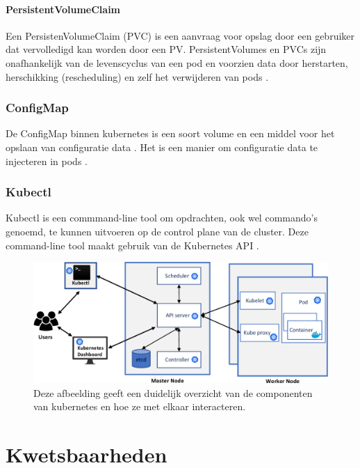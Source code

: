 \paragraph{PersistentVolumeClaim}
Een PersistenVolumeClaim (PVC) is een aanvraag voor opslag door een gebruiker dat vervolledigd kan worden door een PV. PersistentVolumes en PVCs zijn onafhankelijk van de levenscyclus van een pod en voorzien data door herstarten, herschikking (rescheduling) en zelf het verwijderen van pods \autocite{KubernetesDocs-2023}. 

\subsubsection{ConfigMap}
De ConfigMap binnen kubernetes is een soort volume en een middel voor het opslaan van configuratie data \autocite{KubernetesDocs-2023}.
Het is een manier om configuratie data te injecteren in pods \autocite{KubernetesDocs-2023}.

\subsubsection{Kubectl}
Kubectl is een commmand-line tool om opdrachten, ook wel commando's genoemd, te kunnen uitvoeren op de control plane van de cluster.
Deze command-line tool maakt gebruik van de Kubernetes API \autocite{KubernetesDocs-2023}.

\begin{flushleft}
    \begin{figure}[h]
        \includegraphics[width=.70\textwidth]{graphics/3-Figure1-1.png}
        \caption{\label{fig:KubernetesOverview}Deze afbeelding geeft een duidelijk overzicht van de componenten van kubernetes en hoe ze met elkaar interacteren.  \autocite{shamim2020xi}}
    \end{figure} 
\end{flushleft}


\section{Kwetsbaarheden}

